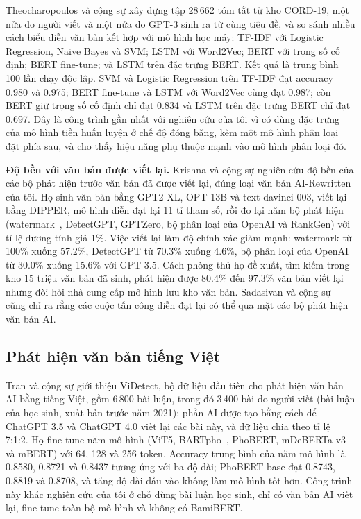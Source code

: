 \documentclass[conference,a4paper]{IEEEtran}
\begin{document}
Theocharopoulos và cộng sự \cite{theocharopoulos} xây dựng tập 28\,662 tóm tắt từ kho CORD-19, một nửa do người viết và một nửa do GPT-3 sinh ra từ cùng tiêu đề, và so sánh nhiều cách biểu diễn văn bản kết hợp với mô hình học máy: TF-IDF với Logistic Regression, Naive Bayes và SVM; LSTM với Word2Vec; BERT \cite{bert} với trọng số cố định; BERT fine-tune; và LSTM trên đặc trưng BERT. Kết quả là trung bình 100 lần chạy độc lập. SVM và Logistic Regression trên TF-IDF đạt accuracy 0.980 và 0.975; BERT fine-tune và LSTM với Word2Vec cùng đạt 0.987; còn BERT giữ trọng số cố định chỉ đạt 0.834 và LSTM trên đặc trưng BERT chỉ đạt 0.697. Đây là công trình gần nhất với nghiên cứu của tôi vì có dùng đặc trưng của mô hình tiền huấn luyện ở chế độ đóng băng, kèm một mô hình phân loại đặt phía sau, và cho thấy hiệu năng phụ thuộc mạnh vào mô hình phân loại đó.

\textbf{Độ bền với văn bản được viết lại.} Krishna và cộng sự \cite{krishna2023dipper} nghiên cứu độ bền của các bộ phát hiện trước văn bản đã được viết lại, đúng loại văn bản AI-Rewritten của tôi. Họ sinh văn bản bằng GPT2-XL, OPT-13B và text-davinci-003, viết lại bằng DIPPER, mô hình diễn đạt lại 11 tỉ tham số, rồi đo lại năm bộ phát hiện (watermark~\cite{kirchenbauer2023watermark}, DetectGPT, GPTZero, bộ phân loại của OpenAI và RankGen) với tỉ lệ dương tính giả 1\%. Việc viết lại làm độ chính xác giảm mạnh: watermark từ 100\% xuống 57.2\%, DetectGPT từ 70.3\% xuống 4.6\%, bộ phân loại của OpenAI từ 30.0\% xuống 15.6\% với GPT-3.5. Cách phòng thủ họ đề xuất, tìm kiếm trong kho 15 triệu văn bản đã sinh, phát hiện được 80.4\% đến 97.3\% văn bản viết lại nhưng đòi hỏi nhà cung cấp mô hình lưu kho văn bản. Sadasivan và cộng sự~\cite{sadasivan2023reliable} cũng chỉ ra rằng các cuộc tấn công diễn đạt lại có thể qua mặt các bộ phát hiện văn bản AI.

\subsection{Phát hiện văn bản tiếng Việt}
Tran và cộng sự \cite{videtect} giới thiệu ViDetect, bộ dữ liệu đầu tiên cho phát hiện văn bản AI bằng tiếng Việt, gồm 6\,800 bài luận, trong đó 3\,400 bài do người viết (bài luận của học sinh, xuất bản trước năm 2021); phần AI được tạo bằng cách để ChatGPT 3.5 và ChatGPT 4.0 viết lại các bài này, và dữ liệu chia theo tỉ lệ 7:1:2. Họ fine-tune năm mô hình (ViT5, BARTpho~\cite{tran2022bartpho}, PhoBERT, mDeBERTa-v3 và mBERT) với 64, 128 và 256 token. Accuracy trung bình của năm mô hình là 0.8580, 0.8721 và 0.8437 tương ứng với ba độ dài; PhoBERT-base đạt 0.8743, 0.8819 và 0.8708, và tăng độ dài đầu vào không làm mô hình tốt hơn. Công trình này khác nghiên cứu của tôi ở chỗ dùng bài luận học sinh, chỉ có văn bản AI viết lại, fine-tune toàn bộ mô hình và không có BamiBERT.
\end{document}
